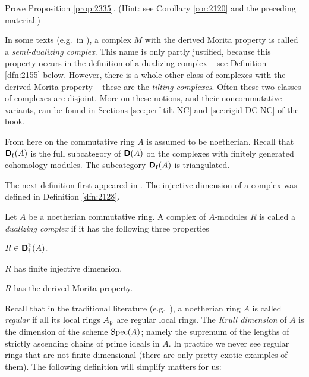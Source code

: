 \begin{exer}
Prove Proposition \ref{prop:2335}.
(Hint: see Corollary \ref{cor:2120} and the preceding material.) 
\end{exer}

\begin{rem} \label{rem:2390}
In some texts (e.g.\ in \cite{AIL}), a complex $M$ with the derived Morita 
property is called a {\em semi-dualizing complex}. This name is only partly 
justified, because this 
property occurs in the definition of a dualizing complex -- see Definition 
\ref{dfn:2155} below. However, there is a whole other class of 
complexes with the derived Morita property -- these are the {\em tilting 
complexes}. Often these two classes of complexes are disjoint. More on these 
notions, and their noncommutative variants, can be found in Sections 
\ref{sec:perf-tilt-NC} and \ref{sec:rigid-DC-NC} of the book. 
\end{rem}

From here on the commutative ring $A$ is assumed to be noetherian.
Recall that $\boldsymbol{\mathsf{D}}_{\mathrm{f}}(A)$ is the full subcategory of 
$\boldsymbol{\mathsf{D}}(A)$ on the complexes with finitely generated cohomology modules. The 
subcategory $\boldsymbol{\mathsf{D}}_{\mathrm{f}}(A)$ is triangulated. 

The next definition first appeared in \cite[Section V.2]{RD}. 
The injective dimension of a complex was defined in Definition \ref{dfn:2128}.

\begin{dfn} \label{dfn:2155}
Let $A$ be a noetherian commutative ring. A complex of $A$-modules $R$ is 
called a {\em dualizing complex} 
if it has the following three 
properties\tup{:} 
\begin{enumerate}
 $R \in \boldsymbol{\mathsf{D}}^{\mathrm{b}}_{\mathrm{f}}(A)$. 

 $R$ has finite injective dimension. 

 $R$ has the derived Morita property.
\end{enumerate}
\end{dfn}

Recall that in the traditional literature (e.g.\ \cite{Mats}), a noetherian 
ring $A$ is called {\em regular} if all its local 
rings $A_{\mathfrak{p}}$ are regular local rings. The {\em Krull dimension} of $A$ is the 
dimension of the scheme $\operatorname{Spec}(A)$; namely the supremum of the 
lengths of strictly ascending chains of prime ideals in $A$. 
In practice we never see regular rings that are not finite dimensional (there 
are only pretty exotic examples of them). 
The following definition will simplify matters for us:

